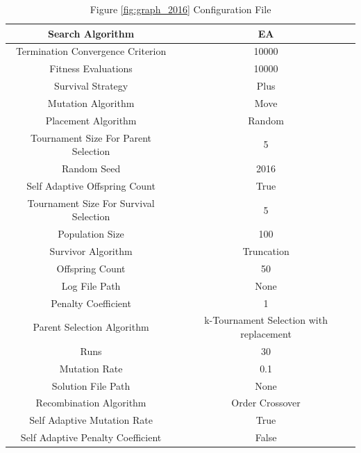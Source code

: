 \documentclass{standalone}
\begin{document}
\begin{table}[!htb]
	\centering
	\caption{Figure \ref{fig:graph_2016} Configuration File}
	\label{tab:graph_2016}
	\begin{tabular}{| c | c |}
		\hline
		Search Algorithm		& EA		 \\
		\hline
		Termination Convergence Criterion		& 10000		 \\
		\hline
		Fitness Evaluations		& 10000		 \\
		\hline
		Survival Strategy		& Plus		 \\
		\hline
		Mutation Algorithm		& Move		 \\
		\hline
		Placement Algorithm		& Random		 \\
		\hline
		Tournament Size For Parent Selection		& 5		 \\
		\hline
		Random Seed		& 2016		 \\
		\hline
		Self Adaptive Offspring Count		& True		 \\
		\hline
		Tournament Size For Survival Selection		& 5		 \\
		\hline
		Population Size		& 100		 \\
		\hline
		Survivor Algorithm		& Truncation		 \\
		\hline
		Offspring Count		& 50		 \\
		\hline
		Log File Path		& None		 \\
		\hline
		Penalty Coefficient		& 1		 \\
		\hline
		Parent Selection Algorithm		& k-Tournament Selection with replacement		 \\
		\hline
		Runs		& 30		 \\
		\hline
		Mutation Rate		& 0.1		 \\
		\hline
		Solution File Path		& None		 \\
		\hline
		Recombination Algorithm		& Order Crossover		 \\
		\hline
		Self Adaptive Mutation Rate		& True		 \\
		\hline
		Self Adaptive Penalty Coefficient		& False		 \\
		\hline
	\end{tabular}
\end{table}
\end{document}
